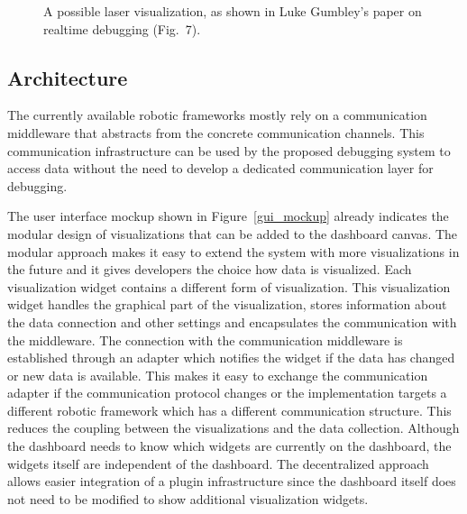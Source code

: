 \begin{figure}%
  \centering
  \caption[A possible laser visualization.]{A possible laser visualization, as shown in Luke Gumbley's paper on realtime debugging (Fig.~7). \cite{Gumbley2009}}
  \label{laser_viz}
\end{figure}

\subsection{Architecture}
The currently available robotic frameworks mostly rely on a communication middleware that abstracts from the concrete communication channels. This communication infrastructure can be used by the proposed debugging system to access data without the need to develop a dedicated communication layer for debugging.

The user interface mockup shown in Figure~\ref{gui_mockup} already indicates the modular design of visualizations that can be added to the dashboard canvas. The modular approach makes it easy to extend the system with more visualizations in the future and it gives developers the choice how data is visualized. Each visualization widget contains a different form of visualization. This visualization widget handles the graphical part of the visualization, stores information about the data connection and other settings and encapsulates the communication with the middleware. The connection with the communication middleware is established through an adapter which notifies the widget if the data has changed or new data is available. This makes it easy to exchange the communication adapter if the communication protocol changes or the implementation targets a different robotic framework which has a different communication structure. This reduces the coupling between the visualizations and the data collection. Although the dashboard needs to know which widgets are currently on the dashboard, the widgets itself are independent of the dashboard. The decentralized approach allows easier integration of a plugin infrastructure since the dashboard itself does not need to be modified to show additional visualization widgets.

